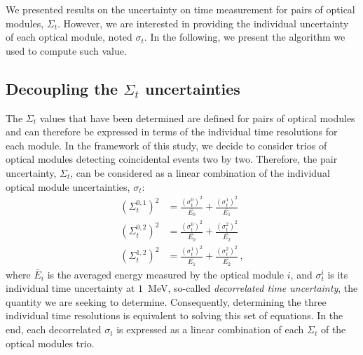 


We presented results on the uncertainty on time measurement for pairs of optical modules, $\Sigma_{t}$.
However, we are interested in providing the individual uncertainty of each optical module, noted $\sigma_{t}$.
In the following, we present the algorithm we used to compute such value.




\subsection{Decoupling the $\Sigma_{t}$ uncertainties}

The $\Sigma_{t}$ values that have been determined are defined for pairs of optical modules and can therefore be expressed in terms of the individual time resolutions for each module.
In the framework of this study, we decide to consider trios of optical modules detecting coincidental events two by two.
Therefore, the pair uncertainty, $\Sigma_{t}$, can be considered as a linear combination of the individual optical module uncertainties, $\sigma_{t}$:
\begin{align}
  (\Sigma_{t}^{0,1})^{2} &= \frac{(\sigma_{t}^{0})^{2}}{\bar{E_{0}}} + \frac{(\sigma_{t}^{1})^{2}}{\bar{E_{1}}}\nonumber \\
  (\Sigma_{t}^{0,2})^{2} &= \frac{(\sigma_{t}^{0})^{2}}{\bar{E_{0}}} + \frac{(\sigma_{t}^{2})^{2}}{\bar{E_{2}}}\\
  (\Sigma_{t}^{1,2})^{2} &= \frac{(\sigma_{t}^{1})^{2}}{\bar{E_{1}}} + \frac{(\sigma_{t}^{2})^{2}}{\bar{E_{2}}} \nonumber\,,
  \label{eq:Co_sigma}
\end{align}
where $\bar{E}_{i}$ is the averaged energy measured by the optical module $i$, and $\sigma_{t}^{i}$ is its individual time uncertainty at $1$~MeV, so-called \emph{decorrelated time uncertainty}, the quantity we are seeking to determine.
Consequently, determining the three individual time resolutions is equivalent to solving this set of equations.
In the end, each decorrelated $\sigma_{t}$ is expressed as a linear combination of each $\Sigma_{t}$ of the optical modules trio.

